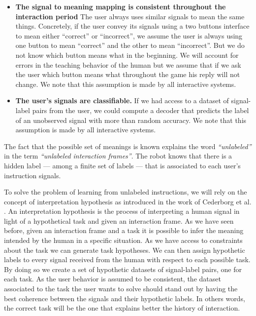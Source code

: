 \begin{itemize}
\item \textbf{The signal to meaning mapping is consistent throughout the interaction period} The user always uses similar signals to mean the same things. Concretely, if the user convey its signals using a two buttons interface to mean either ``correct'' or ``incorrect'', we assume the user is always using one button to mean ``correct'' and the other to mean ``incorrect''. But we do not know which button means what in the beginning. We will account for errors in the teaching behavior of the human but we assume that if we ask the user which button means what throughout the game his reply will not change. We note that this assumption is made by all interactive systems.

\item \textbf{The user's signals are classifiable.} If we had access to a dataset of signal-label pairs from the user, we could compute a decoder that predicts the label of an unobserved signal with more than random accuracy. We note that this assumption is made by all interactive systems.

\end{itemize}

The fact that the possible set of meanings is known explains the word \emph{``unlabeled''} in the term \emph{``unlabeled interaction frames''}. The robot knows that there is a hidden label --- among a finite set of labels --- that is associated to each user's instruction signals.

To solve the problem of learning from unlabeled instructions, we will rely on the concept of interpretation hypothesis as introduced in the work of Cederborg et al. \cite{cederborg2014social,cederborg2014thesis}. An interpretation hypothesis is the process of interpreting a human signal in light of a hypothetical task and given an interaction frame. As we have seen before, given an interaction frame and a task it is possible to infer the meaning intended by the human in a specific situation. As we have access to constraints about the task we can generate task hypotheses. We can then assign hypothetic labels to every signal received from the human with respect to each possible task. By doing so we create a set of hypothetic datasets of signal-label pairs, one for each task. As the user behavior is assumed to be consistent, the dataset associated to the task the user wants to solve should stand out by having the best coherence between the signals and their hypothetic labels. In others words, the correct task will be the one that explains better the history of interaction.

